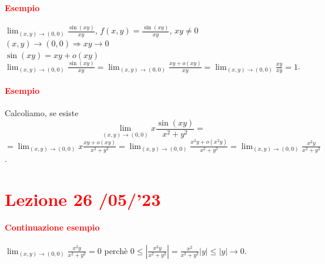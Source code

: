 \documentclass{article}
\begin{document}
\paragraph{\textcolor{red}{Esempio}}
$\lim_{(x,y)\rightarrow(0,0)}\frac{\sin(xy)}{xy}$, $f(x,y)=\frac{\sin(xy)}{xy}$, $xy\neq 0$
$(x,y)\rightarrow (0,0)\Rightarrow xy \rightarrow 0$\\
$\sin(xy)=xy+o(xy)$
$\lim_{(x,y)\rightarrow(0,0)} \frac{\sin(xy)}{xy}=\lim_{(x,y)\rightarrow(0,0)}\frac{xy+o(xy)}{xy}=\lim_{(x,y)\rightarrow(0,0)}\frac{xy}{xy}=1$.

\paragraph{\textcolor{red}{Esempio}}
Calcoliamo, se esiste
\begin{equation*}
    \lim_{(x,y)\rightarrow(0,0)}x\frac{\sin(xy)}{x^2+y^2}=
\end{equation*}
$=\lim_{(x,y)\rightarrow(0,0)}x \frac{xy+o(xy)}{x^2+y^2}=\lim_{(x,y)\rightarrow(0,0)}\frac{x^2y+o(x^2y)}{x^2+y^2}=\lim_{(x,y)\rightarrow(0,0)}\frac{x^2y}{x^2+y^2}$.

\newpage
\section{\textcolor{red}{Lezione 26 \space{}/05/'23}}
\paragraph{\textcolor{red}{Continuazione esempio}}
$\lim_{(x,y)\rightarrow(0,0)} \frac{x^2y}{x^2+y^2}=0 $ perchè $0 \leq |\frac{x^2y}{x^2+y^2}| = \frac{x^2}{x^2+y^2}|y|\leq |y| \rightarrow 0$.
\end{document}
